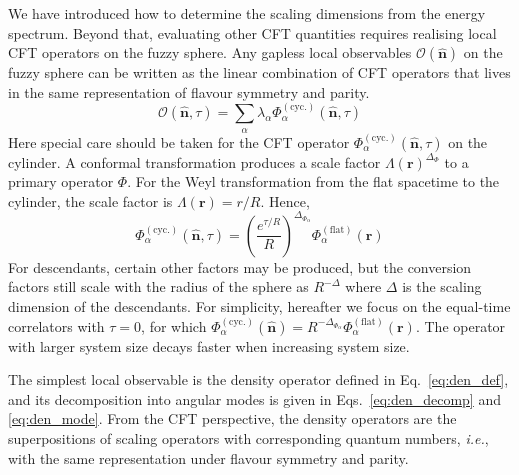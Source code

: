 \documentclass{timesjhep}
\begin{document}
We have introduced how to determine the scaling dimensions from the energy spectrum. Beyond that, evaluating other CFT quantities requires realising local CFT operators on the fuzzy sphere. Any gapless local observables $\mathcal{O}(\hat{\mathbf{n}})$ on the fuzzy sphere can be written as the linear combination of CFT operators that lives in the same representation of flavour symmetry and parity. 
\begin{equation}
    \mathcal{O}(\hat{\mathbf{n}},\tau)=\sum_\alpha \lambda_\alpha\Phi^{(\mathrm{cyc.})}_\alpha(\hat{\mathbf{n}},\tau) 
\end{equation} 
Here special care should be taken for the CFT operator $\Phi^{(\mathrm{cyc.})}_\alpha(\hat{\mathbf{n}},\tau)$ on the cylinder. A conformal transformation produces a scale factor $\Lambda(\mathbf{r})^{\Delta_\Phi}$ to a primary operator $\Phi$. For the Weyl transformation from the flat spacetime to the cylinder, the scale factor is $\Lambda(\mathbf{r})=r/R$. Hence, 
\begin{equation}
    \Phi^{(\mathrm{cyc.})}_\alpha(\hat{\mathbf{n}},\tau)=\left(\frac{e^{\tau/R}}{R}\right)^{\Delta_{\Phi_\alpha}}\Phi_\alpha^{\mathrm{(flat)}}(\mathbf{r})
\end{equation}
For descendants, certain other factors may be produced, but the conversion factors still scale with the radius of the sphere as $R^{-\Delta}$ where $\Delta$ is the scaling dimension of the descendants. For simplicity, hereafter we focus on the equal-time correlators with $\tau=0$, for which $\Phi^{(\mathrm{cyc.})}_\alpha(\hat{\mathbf{n}})=R^{-\Delta_{\Phi_\alpha}}\Phi_\alpha^{\mathrm{(flat)}}(\mathbf{r})$. The operator with larger system size decays faster when increasing system size. 

The simplest local observable is the density operator defined in Eq.~\eqref{eq:den_def}, and its decomposition into angular modes is given in Eqs.~\eqref{eq:den_decomp} and \eqref{eq:den_mode}. From the CFT perspective, the density operators are the superpositions of scaling operators with corresponding quantum numbers, \textit{i.e.}, with the same representation under flavour symmetry and parity. 
\end{document}
